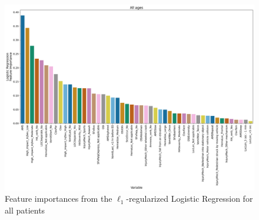 \documentclass[11pt, letterpaper]{amsart}
\begin{document}
\begin{figure}
	\centering
	\includegraphics[width=\textwidth]{lr_feat_importance_all.png}
	\caption{Feature importances from the $\ell_1$-regularized Logistic Regression for all patients}\label{fig:lr_ft_all}
\end{figure}
\end{document}
